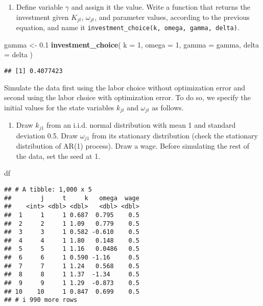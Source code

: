 \documentclass[
]{book}
\newenvironment{Shaded}{\begin{snugshade}}{\end{snugshade}}
\newcommand{\AttributeTok}[1]{\textcolor[rgb]{0.13,0.29,0.53}{#1}}
\newcommand{\DecValTok}[1]{\textcolor[rgb]{0.00,0.00,0.81}{#1}}
\newcommand{\FloatTok}[1]{\textcolor[rgb]{0.00,0.00,0.81}{#1}}
\newcommand{\FunctionTok}[1]{\textcolor[rgb]{0.13,0.29,0.53}{\textbf{#1}}}
\newcommand{\NormalTok}[1]{#1}
\newcommand{\OtherTok}[1]{\textcolor[rgb]{0.56,0.35,0.01}{#1}}
\providecommand{\tightlist}{%
  \setlength{\itemsep}{0pt}\setlength{\parskip}{0pt}}
\begin{document}
\begin{enumerate}
\def\labelenumi{\arabic{enumi}.}
\setcounter{enumi}{4}
\tightlist
\item
  Define variable \(\gamma\) and assign it the value. Write a function that returns the investment given \(K_{jt}\), \(\omega_{jt}\), and parameter values, according to the previous equation, and name it \texttt{investment\_choice(k,\ omega,\ gamma,\ delta)}.
\end{enumerate}

\begin{Shaded}
\begin{Highlighting}[]
\NormalTok{gamma }\OtherTok{\textless{}{-}} \FloatTok{0.1}
\FunctionTok{investment\_choice}\NormalTok{(}
  \AttributeTok{k =} \DecValTok{1}\NormalTok{, }
  \AttributeTok{omega =} \DecValTok{1}\NormalTok{, }
  \AttributeTok{gamma =}\NormalTok{ gamma, }
  \AttributeTok{delta =}\NormalTok{ delta}
\NormalTok{  )}
\end{Highlighting}
\end{Shaded}

\begin{verbatim}
## [1] 0.4077423
\end{verbatim}

Simulate the data first using the labor choice without optimization error and second using the labor choice with optimization error. To do so, we specify the initial values for the state variables \(k_{jt}\) and \(\omega_{jt}\) as follows.

\begin{enumerate}
\def\labelenumi{\arabic{enumi}.}
\setcounter{enumi}{5}
\tightlist
\item
  Draw \(k_{j1}\) from an i.i.d. normal distribution with mean 1 and standard deviation 0.5. Draw \(\omega_{j1}\) from its stationary distribution (check the stationary distribution of AR(1) process). Draw a wage. Before simulating the rest of the data, set the seed at 1.
\end{enumerate}

\begin{Shaded}
\begin{Highlighting}[]
\NormalTok{df}
\end{Highlighting}
\end{Shaded}

\begin{verbatim}
## # A tibble: 1,000 x 5
##        j     t     k   omega  wage
##    <int> <dbl> <dbl>   <dbl> <dbl>
##  1     1     1 0.687  0.795    0.5
##  2     2     1 1.09   0.779    0.5
##  3     3     1 0.582 -0.610    0.5
##  4     4     1 1.80   0.148    0.5
##  5     5     1 1.16   0.0486   0.5
##  6     6     1 0.590 -1.16     0.5
##  7     7     1 1.24   0.568    0.5
##  8     8     1 1.37  -1.34     0.5
##  9     9     1 1.29  -0.873    0.5
## 10    10     1 0.847  0.699    0.5
## # i 990 more rows
\end{verbatim}
\end{document}
